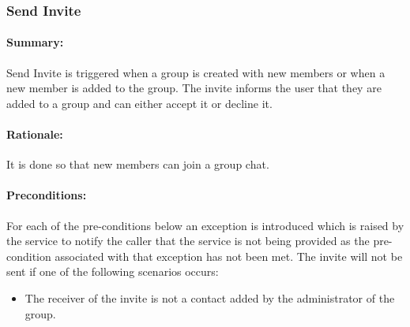 \documentclass[11pt]{article}
\begin{document}
 

\subsubsection{Send Invite} \label{UC-send-invite}
\paragraph{Summary:} Send Invite is triggered when a group is created with new members or when a new member is added to the group. The invite informs the user that they are added to a group and can either accept it or decline it.
\paragraph{Rationale:} It is done so that new members can join a group chat.
\paragraph{Preconditions:}
 For each of the pre-conditions below an exception is introduced which is raised by the service to notify the caller that the service is not being provided as the pre-condition associated with that exception has not been met.\newline
 The invite will not be sent if one of the following scenarios occurs:
 \begin{itemize}
 \item	The receiver of the invite is not a contact added by the administrator of the group.
 \end{itemize}
\end{document}
